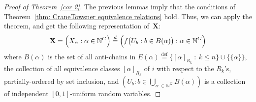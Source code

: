 \documentclass[10pt]{amsart}
\theoremstyle{definition}\newtheorem{defi}[theo]{Definition}\newtheorem{rema}[theo]{Remark}\newtheorem{exam}[theo]{Example}\newtheorem{exem}[theo]{Example}\newtheorem{nota}[theo]{Notation}
\newcommand*{\defeq}{\stackrel{\mathrm{def}}{=}}
\renewcommand{\d}{\buildrel{d}\over{=}}
\newcommand*\N{\mathbb{N}}
\newcommand*\bX{\mathbf{X}}
\begin{document}
\begin{proof}[Proof of Theorem~\ref{cor 2}] The previous lemmas imply that the conditions of Theorem~\ref{thm: CraneTowsner equivalence relations} hold. Thus, we can apply the theorem, and get the following representation of~$\bX$:
\begin{equation}\label{eqn:CT-representation:1}
\bX = \Big(X_\alpha : \alpha \in \N^G\Big) \d \Big(f\big(U_b : b \in B(\alpha)\big) : \alpha \in \N^G\Big)
\end{equation}
where $B(\alpha)$ is the set of all anti-chains in $E(\alpha)
\defeq \{[\alpha]_{R_k}~:~k\leq n\}\cup\{\{\alpha\}\}$, the collection of all equivalence classes $[\alpha]_{R_k}$ of $i$ with respect to the $R_k$'s, partially-ordered by set inclusion, and $(U_b : b \in \bigcup_{\alpha\,\in\,\N^G} B(\alpha))$ is a collection of independent $[0,1]$-uniform random variables.


\end{proof}
\end{document}
